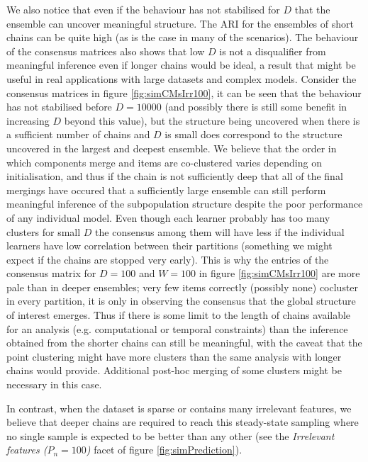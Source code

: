 \documentclass[]{article}
\begin{document}
We also notice that even if the behaviour has not stabilised for $D$ that the ensemble can uncover meaningful structure. The ARI for the ensembles of short chains can be quite high (as is the case in many of the scenarios). The behaviour of the consensus matrices also shows that low $D$ is not a disqualifier from meaningful inference even if longer chains would be ideal, a result that might be useful in real applications with large datasets and complex models. Consider the consensus matrices in figure \ref{fig:simCMsIrr100}, it can be seen that the behaviour has not stabilised before $D=10000$ (and possibly there is still some benefit in increasing $D$ beyond this value), but the structure being uncovered when there is a sufficient number of chains and $D$ is small does correspond to the structure uncovered in the largest and deepest ensemble. We believe that the order in which components merge and items are co-clustered varies depending on initialisation, and thus if the chain is not sufficiently deep that all of the final mergings have occured that a sufficiently large ensemble can still perform meaningful inference of the subpopulation structure despite the poor performance of any individual model. Even though each learner probably has too many clusters for small $D$ the consensus among them will have less if the individual learners have low correlation between their partitions (something we might expect if the chains are stopped very early). This is why the entries of the consensus matrix for $D=100$ and $W=100$ in figure \ref{fig:simCMsIrr100} are more pale than in deeper ensembles; very few items correctly (possibly none) cocluster in every partition, it is only in observing the consensus that the global structure of interest emerges. Thus if there is some limit to the length of chains available for an analysis (e.g. computational or temporal constraints) than the inference obtained from the shorter chains can still be meaningful, with the caveat that the point clustering might have more clusters than the same analysis with longer chains would provide. Additional post-hoc merging of some clusters might be necessary in this case.

In contrast, when the dataset is sparse or contains many irrelevant features, we believe that deeper chains are required to reach this steady-state sampling where no single sample is expected to be better than any other (see the \emph{Irrelevant features ($P_n = 100$)} facet of figure \ref{fig:simPrediction}).
\end{document}
